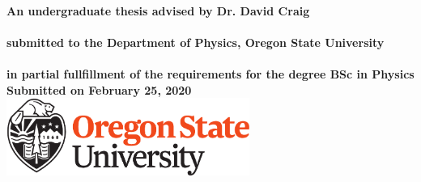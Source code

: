 

\thispagestyle{empty}

\begingroup
\centering
{}
~
\\[1em]
\sffamily\bfseries\fontsize{26}{31.2}\selectfont
\DocumentTitle
\\[0.6in]
\sffamily\bfseries\Large
\AuthorName
\\[0.6in]
\normalfont\normalsize
An undergraduate thesis advised by Dr. David Craig \\~\\
submitted to the Department of Physics, Oregon State University \\~\\
in partial fullfillment of the requirements for the degree BSc in Physics \\[0.6in]
Submitted on February 25, 2020
\vfill
\includegraphics[height=1.0in]
{Figure-SchoolLogo}
\par
\endgroup

\clearpage


%
%

%
%

